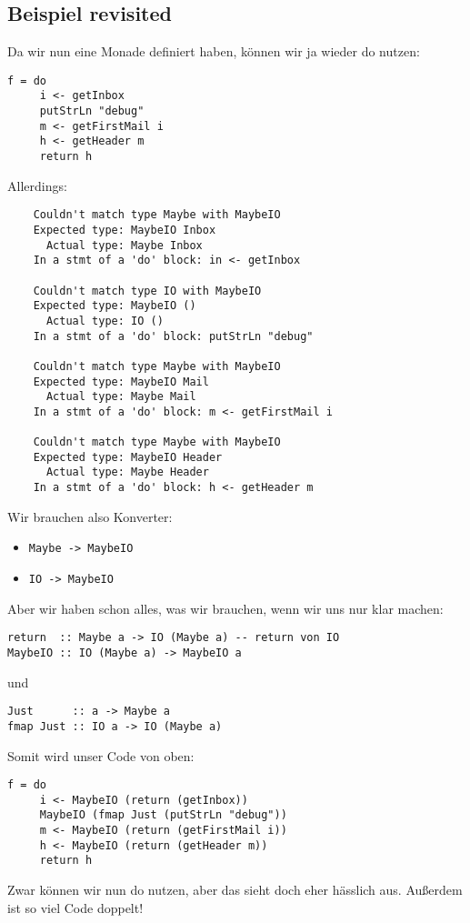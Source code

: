 \documentclass{beamer}
\begin{document}
\subsection{Beispiel revisited}
\begin{frame}[fragile]
Da wir nun eine Monade definiert haben, können wir ja wieder do nutzen:
\begin{verbatim}
f = do
     i <- getInbox
     putStrLn "debug"
     m <- getFirstMail i
     h <- getHeader m
     return h
\end{verbatim}
\end{frame}
\begin{frame}[fragile]
Allerdings:
\begin{verbatim}
    Couldn't match type Maybe with MaybeIO
    Expected type: MaybeIO Inbox
      Actual type: Maybe Inbox
    In a stmt of a 'do' block: in <- getInbox

    Couldn't match type IO with MaybeIO
    Expected type: MaybeIO ()
      Actual type: IO ()
    In a stmt of a 'do' block: putStrLn "debug"

    Couldn't match type Maybe with MaybeIO
    Expected type: MaybeIO Mail
      Actual type: Maybe Mail
    In a stmt of a 'do' block: m <- getFirstMail i
    
    Couldn't match type Maybe with MaybeIO
    Expected type: MaybeIO Header
      Actual type: Maybe Header
    In a stmt of a 'do' block: h <- getHeader m
\end{verbatim}
\end{frame}

\begin{frame}[fragile]
Wir brauchen also Konverter:
\begin{itemize}
 \item \texttt{Maybe -> MaybeIO}
 \item \texttt{IO -> MaybeIO}
\end{itemize}
\pause
Aber wir haben schon alles, was wir brauchen, wenn wir uns nur klar machen:
\begin{verbatim}
return  :: Maybe a -> IO (Maybe a) -- return von IO
MaybeIO :: IO (Maybe a) -> MaybeIO a
\end{verbatim}
\pause
und
\begin{verbatim}
Just      :: a -> Maybe a
fmap Just :: IO a -> IO (Maybe a)
\end{verbatim}
\end{frame}

\begin{frame}[fragile]
Somit wird unser Code von oben:
\begin{verbatim}
f = do
     i <- MaybeIO (return (getInbox))
     MaybeIO (fmap Just (putStrLn "debug"))
     m <- MaybeIO (return (getFirstMail i))
     h <- MaybeIO (return (getHeader m))
     return h
\end{verbatim}
\pause
Zwar können wir nun do nutzen, aber das sieht doch eher hässlich aus. Außerdem ist so viel Code doppelt!
\end{frame}
\end{document}
